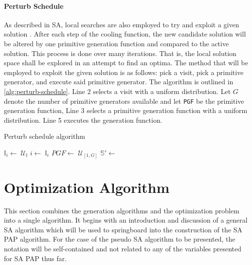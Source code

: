 \documentclass[11pt,a4paper,final]{article}
\newcommand{\I}{\mathbb{I}}                 %
\newcommand{\C}{\mathbb{C}}                 %
\newcommand{\U}{\mathcal{U}}                %
\newcommand{\Sol}{\mathbb{S}}               %
\begin{document}
\paragraph{Perturb Schedule}
\label{sec:tweak-schedule}
As described in SA, local searches are also employed to try and exploit a given solution
\cite{radosavljevic-2018-metah-optim}. After each step of the cooling function, the new candidate solution will be
altered by one primitive generation function and compared to the active solution. This process is done over many
iterations. That is, the local solution space shall be explored in an attempt to find an optima. The method that will be
employed to exploit the given solution is as follows: pick a visit, pick a primitive generator, and execute said
primitive generator. The algorithm is outlined in \ref{alg:perturb-schedule}. Line 2 selects a visit with a uniform
distribution. Let \(G\) denote the number of primitive generators available and let \texttt{PGF} be the primitive generation
function, Line 3 selects a primitive generation function with a uniform distribution. Line 5 executes the generation
function.

\begin{algorithm}[H]
\caption{Perturb schedule algorithm} \label{alg:perturb-schedule}

    \LinesNumbered
    \KwIn{$\I$, $\C$}
    \KwOut{$\I_i'$, $\C'$}


    \Begin
    {
        $\I_i\leftarrow\; \U_{\I}$
        $i \leftarrow\; \I_i$
        $PGF \leftarrow\; \U_{[1,G]}$
        $\Sol' \leftarrow$ \PGF{($i$, $\I$, $\C$)}
        \Return{($\I'$, $\C'$)}
    }
\end{algorithm}
\section{Optimization Algorithm}
\label{sec:optimization-algorithm}
This section combines the generation algorithms and the optimization problem into a single algorithm. It begins with an
introduction and discussion of a general SA algorithm which will be used to springboard into the construction of the SA
PAP algorithm. For the case of the pseudo SA algorithm to be presented, the notation will be self-contained and not
related to any of the variables presented for SA PAP thus far.
\end{document}
